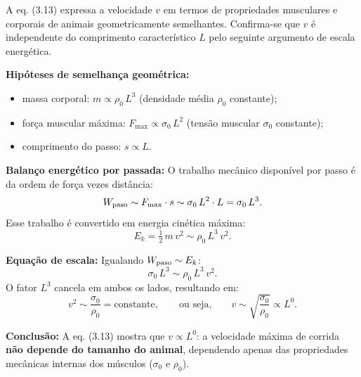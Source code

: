 A eq. (3.13) expressa a velocidade $v$ em termos de propriedades musculares e corporais de animais geometricamente semelhantes. Confirma-se que $v$ é independente do comprimento característico $L$ pelo seguinte argumento de escala energética.

\textbf{Hipóteses de semelhança geométrica:}
\begin{itemize}
\item massa corporal: $m \propto \rho_0\,L^3$ (densidade média $\rho_0$ constante);
\item força muscular máxima: $F_{\max} \propto \sigma_0\,L^2$ (tensão muscular $\sigma_0$ constante);
\item comprimento do passo: $s \propto L$.
\end{itemize}

\textbf{Balanço energético por passada:}
O trabalho mecânico disponível por passo é da ordem de força vezes distância:
\[
W_{\rm paso} \sim F_{\max}\cdot s \sim \sigma_0\,L^2 \cdot L = \sigma_0\,L^3.
\]
Esse trabalho é convertido em energia cinética máxima:
\[
E_k = \tfrac{1}{2}\,m\,v^2 \sim \rho_0\,L^3\,v^2.
\]

\textbf{Equação de escala:}
Igualando $W_{\rm paso} \sim E_k$:
\[
\sigma_0\,L^3 \sim \rho_0\,L^3\,v^2.
\]
O fator $L^3$ cancela em ambos os lados, resultando em:
\[
v^2 \sim \frac{\sigma_0}{\rho_0} = \text{constante},\qquad\text{ou seja,}\qquad v \sim \sqrt{\frac{\sigma_0}{\rho_0}} \propto L^0.
\]

\textbf{Conclusão:} A eq. (3.13) mostra que $v \propto L^0$: a velocidade máxima de corrida \textbf{não depende do tamanho do animal}, dependendo apenas das propriedades mecânicas internas dos músculos ($\sigma_0$ e $\rho_0$).

